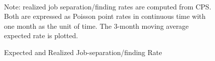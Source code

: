      
    \clearpage
    \begin{figure}[!ht]
      \caption{Expected and Realized Job-separation/finding Rate}
    \label{fig:srate_compare}
    	\begin{center} \\
    	\medskip
    	\end{center}
    \begin{flushleft}Note: realized job separation/finding rates are computed from CPS. Both are expressed as Poisson point rates in continuous time with one month as the unit of time. The 3-month moving average expected rate is plotted.\end{flushleft}
    \end{figure}
    
 \newpage
 


 \newpage
 
 \begin{comment}
 
\begin{figure}[!ht]
	\caption{Consumption functions under objective and subjective risk profiles}
	\label{fig:comparison1}
	\begin{center}
		\adjustimage{max size={0.8\linewidth}{0.5\paperheight}}{figures/comparison1.png}
\end{center}
\begin{flushleft}Note: this figure plots an example of age-specific optimal consumption policies under objective and subjective state-dependent income risk profiles, respectively. The two models use the exact same parameter configurations except for the subjective model having agents to stochatically draw a low or high risk perception. Both the average size of transitory and permanent risks are kept equal to that in the objective model.\end{flushleft}
\end{figure}

\newpage 

\begin{figure}[!ht]
	\caption{Consumption functions under objective and state-dependent risk profiles}
	\label{fig:comparison2}
	\begin{center}
		\adjustimage{max size={0.8\linewidth}{0.5\paperheight}}{figures/comparison2.png}
\end{center}
\begin{flushleft}Note: this figure plots age-specific optimal consumption policies under objective and subjective extrapolation model. The former model includes persistent unemployment risks while the latter maintains the same transition probability of employment status but allows the risk perceptions to be dependent upon the employment status of the individual, i.e. unemployed perceive income risks to be higher than the employed.\end{flushleft}
\end{figure}
\end{comment}


